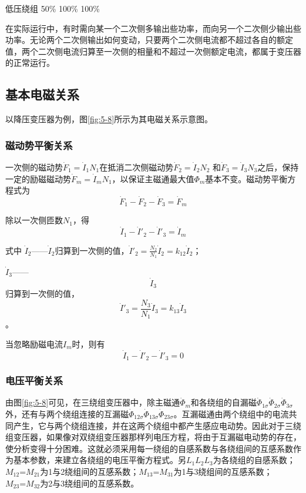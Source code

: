 \documentclass{book}
\begin{document}
低压绕组	50\%	    100\%	100\%

在实际运行中，有时需向某一个二次侧多输出些功率，而向另一个二次侧少输出些功率。无论两个二次侧输出如何变动，只要两个二次侧电流都不超过各自的额定值，两个二次侧电流归算至一次侧的相量和不超过一次侧额定电流，都属于变压器的正常运行。

\subsection{基本电磁关系}

以降压变压器为例，图\ref{fig:5-8}所示为其电磁关系示意图。

\subsubsection{磁动势平衡关系}

一次侧的磁动势${{\dot{F}}_{1}}={{\dot{I}}_{1}}{{N}_{1}}$在抵消二次侧磁动势${{\dot{F}}_{2}}={{\dot{I}}_{2}}{{N}_{2}}$ 和${{\dot{F}}_{3}}={{\dot{I}}_{3}}{{N}_{3}}$之后，保持一定的励磁磁动势${{\dot{F}}_{m}}={{\dot{I}}_{m}}{{N}_{1}}$，以保证主磁通最大值${{\Phi }_{m}}$基本不变。磁动势平衡方程式为
\begin{equation}
{{\dot{F}}_{1}}-{{\dot{F}}_{2}}-{{\dot{F}}_{3}}={{\dot{F}}_{m}}
\label{5-27}
\end{equation}

除以一次侧匝数${{N}_{1}}$，得
\begin{equation}
{{\dot{I}}_{1}}-{{{\dot{I}}'}_{2}}-{{{\dot{I}}'}_{3}}={{\dot{I}}_{m}}
\label{5-28}
\end{equation}

式中  ${{\dot{I}}_{2}}$——${{\dot{I}}_{2}}$归算到一次侧的值，${{{\dot{I}}'}_{2}}=\frac{{{N}_{2}}}{{{N}_{1}}}{{\dot{I}}_{2}}={{k}_{12}}{{\dot{I}}_{2}}$；

${{\dot{I}}_{3}}$——\[{{\dot{I}}_{3}}\]归算到一次侧的值，\[{{{\dot{I}}'}_{3}}=\frac{{{N}_{3}}}{{{N}_{1}}}{{\dot{I}}_{3}}={{k}_{13}}{{\dot{I}}_{3}}\]。

当忽略励磁电流${{I}_{m}}$时，则有
\begin{equation}
{{\dot{I}}_{1}}-{{{\dot{I}}'}_{2}}-{{{\dot{I}}'}_{3}}=0
\label{5-29}
\end{equation}

\subsubsection{电压平衡关系}
由图\ref{fig:5-8}可见，在三绕组变压器中，除主磁通${{\dot{\Phi }}_{m}}$和各绕组的自漏磁${{\dot{\Phi }}_{1\sigma }}{{\dot{\Phi }}_{2\sigma }}{{\dot{\Phi }}_{3\sigma }}$外，还有与两个绕组连接的互漏磁${{\dot{\Phi }}_{12\sigma }}{{\dot{\Phi }}_{13\sigma }}{{\dot{\Phi }}_{23\sigma }}$。互漏磁通由两个绕组中的电流共同产生，它与两个绕组连接，并在这两个绕组中都产生感应电动势。因此对于三绕组变压器，如果像对双绕组变压器那样列电压方程，将由于互漏磁电动势的存在，使分析变得十分困难。这就必须采用每一绕组的自感系数与各绕组间的互感系数作为基本参数，来建立各绕组的电压平衡方程式。另${{L}_{1}}{{L}_{2}}{{L}_{3}}$为各绕组的自感系数；${{M}_{12}}\text{=}{{M}_{21}}$为1与2绕组间的互感系数；${{M}_{13}}\text{=}{{M}_{31}}$为1与3绕组间的互感系数；${{M}_{23}}\text{=}{{M}_{32}}$为2与3绕组间的互感系数。
\end{document}
